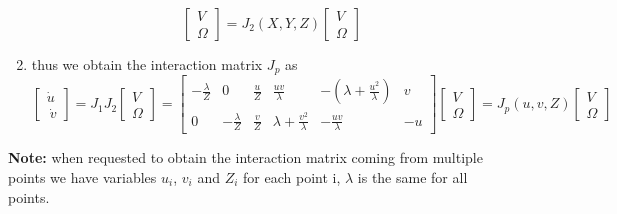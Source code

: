 \documentclass[a4paper,12pt]{article}
\begin{document}
\begin{enumerate}
\begin{equation}
    \begin{bmatrix}
        V \\
        \Omega
    \end{bmatrix}= J_2(X,Y,Z)\begin{bmatrix}
    V\\
    \Omega
    \end{bmatrix}
    \end{equation}
    \item thus we obtain the interaction matrix $J_p$ as \begin{equation}
    \begin{bmatrix}
        \dot{u}\\\
        \dot{v}
    \end{bmatrix}=J_1J_2\begin{bmatrix}
        V\\
        \Omega
    \end{bmatrix}=\begin{bmatrix}
    -\frac{\lambda}{Z} & 0 & \frac{u}{Z} & \frac{uv}{\lambda} & -(\lambda + \frac{u^2}{\lambda}) & v\\
    0 & -\frac{\lambda}{Z} & \frac{v}{Z} & \lambda + \frac{v^2}{\lambda} & -\frac{uv}{\lambda} & -u
    \end{bmatrix} \begin{bmatrix}
        V\\
        \Omega
    \end{bmatrix}=J_p(u,v,Z)\begin{bmatrix}
    V\\
    \Omega
    \end{bmatrix}
    \end{equation}
\end{enumerate}
\textbf{Note:} when requested to obtain the interaction matrix 
coming from multiple points we have variables $u_i$, $v_i$ and $Z_i$
for each point i, $\lambda$ is the same for all points.
\end{document}
